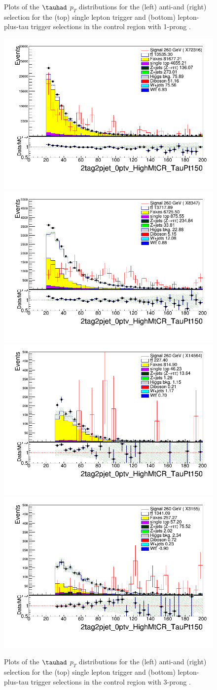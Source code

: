 \begin{figure}
\caption{Plots of the $\tauhad$ $p_T$ distributions for the (left) anti-\tauhad and (right) \tauhad selection for the (top) single lepton trigger and (bottom) lepton-plus-tau trigger selections in the \ttbar control region with 1-prong \tauhad.}
\label{fig:ttbarCR_1}
\end{figure} 

\begin{figure}
\centering
\includegraphics[width=.45\textwidth]{figures/lephadFF/SLT/2tag2pjet_0ptv_HighMtCR_TauPt150_CR_SLT_ALL_ttWeight_3.png}
\includegraphics[width=.45\textwidth]{figures/lephadFF/SLT/2tag2pjet_0ptv_HighMtCR_TauPt150_SR_SLT_ALL_ttWeight_3.png} \\
\includegraphics[width=.45\textwidth]{figures/lephadFF/LTT/2tag2pjet_0ptv_HighMtCR_TauPt150_CR_LTT_ALL_ttWeight_3.png}
\includegraphics[width=.45\textwidth]{figures/lephadFF/LTT/2tag2pjet_0ptv_HighMtCR_TauPt150_SR_LTT_ALL_ttWeight_3.png}\\
\caption{Plots of the $\tauhad$ $p_T$ distributions for the (left) anti-\tauhad and (right) \tauhad selection for the (top) single lepton trigger and (bottom) lepton-plus-tau trigger selections in the \ttbar control region with 3-prong \tauhad.}
\label{fig:ttbarCR_3}
\end{figure}

